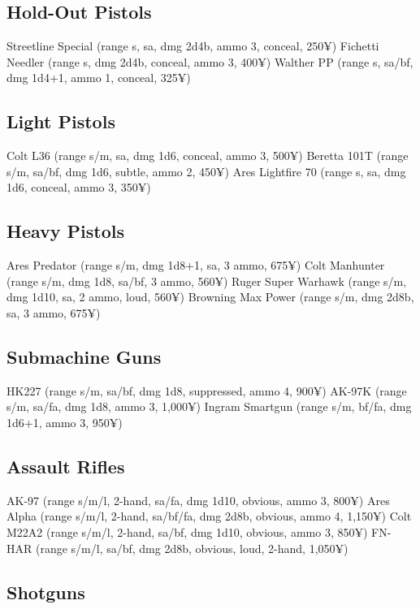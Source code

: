 \subsection{Hold-Out Pistols}

Streetline Special (range s, sa, dmg 2d4b, ammo 3, conceal, 250¥)
Fichetti Needler (range s, dmg 2d4b, conceal, ammo 3, 400¥)
Walther PP (range s, sa/bf, dmg 1d4+1, ammo 1, conceal, 325¥)


\subsection{Light Pistols}

Colt L36 (range s/m, sa, dmg 1d6, conceal, ammo 3, 500¥)
Beretta 101T (range s/m, sa/bf, dmg 1d6, subtle, ammo 2, 450¥)
Ares Lightfire 70 (range s, sa, dmg 1d6, conceal, ammo 3, 350¥)


\subsection{Heavy Pistols}

Ares Predator (range s/m, dmg 1d8+1, sa, 3 ammo, 675¥)
Colt Manhunter (range s/m, dmg 1d8, sa/bf, 3 ammo, 560¥)
Ruger Super Warhawk (range s/m, dmg 1d10, sa, 2 ammo, loud, 560¥)
Browning Max Power (range s/m, dmg 2d8b, sa, 3 ammo, 675¥)


\subsection{Submachine Guns}

HK227 (range s/m, sa/bf, dmg 1d8, suppressed, ammo 4, 900¥)
AK-97K (range s/m, sa/fa, dmg 1d8, ammo 3, 1,000¥)
Ingram Smartgun (range s/m, bf/fa, dmg 1d6+1, ammo 3, 950¥)


\subsection{Assault Rifles}

AK-97 (range s/m/l, 2-hand, sa/fa, dmg 1d10, obvious, ammo 3, 800¥)
Ares Alpha (range s/m/l, 2-hand, sa/bf/fa, dmg 2d8b, obvious, ammo 4, 1,150¥)
Colt M22A2 (range s/m/l, 2-hand, sa/bf, dmg 1d10, obvious, ammo 3, 850¥)
FN-HAR (range s/m/l, sa/bf, dmg 2d8b, obvious, loud, 2-hand, 1,050¥)


\subsection{Shotguns}

